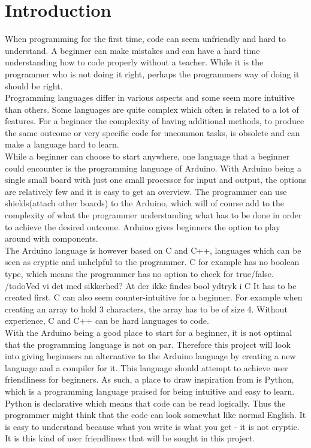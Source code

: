 \section{Introduction}
When programming for the first time, code can seem unfriendly and hard to understand. A beginner can make mistakes and can have a hard time understanding how to code properly without a teacher. While it is the programmer who is not doing it right, perhaps the programmers way of doing it should be right. \\

Programming languages differ in various aspects and some seem more intuitive than others. Some languages are quite complex which often is related to a lot of features. For a beginner the complexity of having additional methods, to produce the same outcome or very specific code for uncommon tasks, is obsolete and can make a language hard to learn. \\

While a beginner can choose to start anywhere, one language that a beginner could encounter is the programming language of Arduino. With Arduino being a single small board with just one small processor for input and output, the options are relatively few and it is easy to get an overview. The programmer can use shields(attach other boards) to the Arduino, which will of course add to the complexity of what the programmer understanding what has to be done in order to achieve the desired outcome. Arduino gives beginners the option to play around with components.\\

The Arduino language is however based on C and C++, languages which can be seen as cryptic and unhelpful to the programmer. C for example has no boolean type, which means the programmer has no option to check for true/false. /todo{Ved vi det med sikkerhed? At der ikke findes bool ydtryk i C} It has to be created first. C can also seem counter-intuitive for a beginner. For example when creating an array to hold 3 characters, the array has to be of size 4.  Without experience, C and C++ can be hard languages to code. \\

With the Arduino being a good place to start for a beginner, it is not optimal that the programming language is not on par.  Therefore this project will look into giving beginners an alternative to the Arduino language by creating a new language and a compiler for it. This language should attempt to achieve user friendliness for beginners. As such, a place to draw inspiration from is Python, which is a programming language praised for being intuitive and easy to learn. Python is declarative which means that code can be read logically. Thus the programmer might think that the code can look somewhat like normal English. It is easy to understand because what you write is what you get - it is not cryptic. It is this kind of user friendliness that will be sought in this project.